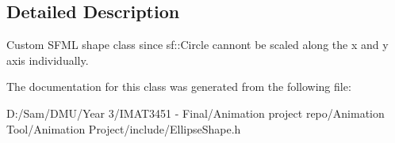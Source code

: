\subsection{Detailed Description}
Custom S\+F\+ML shape class since sf\+::\+Circle cannont be scaled along the x and y axis individually. 

The documentation for this class was generated from the following file\+:\begin{DoxyCompactItemize}
\item 
D\+:/\+Sam/\+D\+M\+U/\+Year 3/\+I\+M\+A\+T3451 -\/ Final/\+Animation project repo/\+Animation Tool/\+Animation Project/include/Ellipse\+Shape.\+h\end{DoxyCompactItemize}
